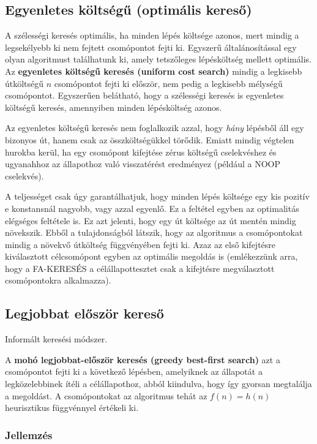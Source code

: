 \subsection{Egyenletes költségű (optimális kereső)}

A szélességi keresés optimális, ha minden lépés költsége azonos, mert mindig a
legsekélyebb ki nem fejtett csomópontot fejti ki. Egyszerű általánosítással egy
olyan algoritmust találhatunk ki, amely tetszőleges lépésköltség mellett
optimális. Az {\bf egyenletes költségű keresés (uniform cost search)} mindig a
legkisebb útköltségű $n$ csomópontot fejti ki először, nem pedig a legkisebb
mélységű csomópontot. Egyszerűen belátható, hogy a szélességi keresés is
egyenletes költségű keresés, amennyiben minden lépésköltség azonos.

Az egyenletes költségű keresés nem foglalkozik azzal, hogy {\it hány} lépésből
áll egy bizonyos út, hanem csak az összköltségükkel törődik. Emiatt mindig
végtelen hurokba kerül, ha egy csomópont kifejtése zérus költségű cselekvéshez
és ugyanahhoz az állapothoz való visszatérést eredményez (például a NOOP
cselekvés).

A teljességet csak úgy garantálhatjuk, hogy minden lépés költsége
egy kis pozitív e konstansnál nagyobb, vagy azzal egyenlő. Ez a feltétel egyben
az optimalitás elégséges feltétele is. Ez azt jelenti, hogy egy út költsége az
út mentén mindig növekszik. Ebből a tulajdonságból látszik, hogy az algoritmus
a csomópontokat mindig a növekvő útköltség függvényében fejti ki. Azaz az első
kifejtésre kiválasztott célcsomópont egyben az optimális megoldás is
(emlékezzünk arra, hogy a FA-KERESÉS a célállapottesztet csak a kifejtésre
megválasztott csomópontokra alkalmazza).

\subsection{Legjobbat először kereső}

Informált keresési módszer.

A {\bf mohó legjobbat-először keresés (greedy best-first search)} azt a
csomópontot fejti ki a következő lépésben, amelyiknek az állapotát a
legközelebbinek ítéli a célállapothoz, abból kiindulva, hogy így gyorsan
megtalálja a megoldást. A csomópontokat az algoritmus tehát az $f(n) = h(n)$
heurisztikus függvénnyel értékeli ki.

\subsubsection{Jellemzés}


